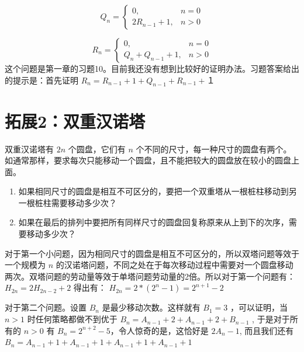 \documentclass[10pt,a4paper,UTF8]{article}
\begin{document}
\begin{equation}
\label{eq:1}
Q_{n} = 
\begin{cases}
 0, & n=0 \\
 2R_{n-1} +1, & n>0
\end{cases}
\end{equation}

\begin{equation}
\label{eq:2}
R_{n} = 
\begin{cases}
 0, & n=0 \\
 Q_{n} + Q_{n-1} +1, & n>0
\end{cases}
\end{equation}
这个问题是第一章的习题10。目前我还没有想到比较好的证明办法。习题答案给出的提示是：首先证明 \(R_{n} = R_{n-1} + 1 + Q_{n-1} + R_{n-1} +１\)
\section{拓展2：双重汉诺塔}
\label{sec:orgheadline5}


双重汉诺塔有 \(2n\) 个圆盘，它们有 \(n\) 个不同的尺寸，每一种尺寸的圆盘有两个。如通常那样，要求每次只能移动一个圆盘，且不能把较大的圆盘放在较小的圆盘上面。

\begin{enumerate}
\item 如果相同尺寸的圆盘是相互不可区分的，要把一个双重塔从一根桩柱移动到另一根桩柱需要移动多少次？
\item 如果在最后的排列中要把所有同样尺寸的圆盘回复称原来从上到下的次序，需要移动多少次？
\end{enumerate}

对于第一个小问题，因为相同尺寸的圆盘是相互不可区分的，所以双塔问题等效于一个规模为 \(n\) 的汉诺塔问题，不同之处在于每次移动过程中需要对一个圆盘移动两次。双塔问题的劳动量等效于单塔问题劳动量的2倍。所以对于第一个问题有： \(H_{2n}= 2H_{2n-2} +2\) 得出有： \(H_{2n} = 2*(2^{n}-1) = 2^{n+1}-2\)

对于第二个问题。设置 \(B_{n}\) 是最少移动次数。这样就有 \(B_{1}=3\) ，可以证明，当 \(n>1\) 时任何策略都做不到优于 \(B_{n} = A_{n-1} +2 + A_{n-1} + 2 + B_{n-1}\) , 于是对于所有的 \(n>0\) 有 \(B_{n} = 2^{n+2} -5\)，令人惊奇的是，这恰好是 \(2A_{n} -1\), 而且我们还有 \(B_{n} = A_{n-1} + 1 + A_{n-1} + 1 + A_{n-1} +1 + A_{n-1} + 1\)
\end{document}

